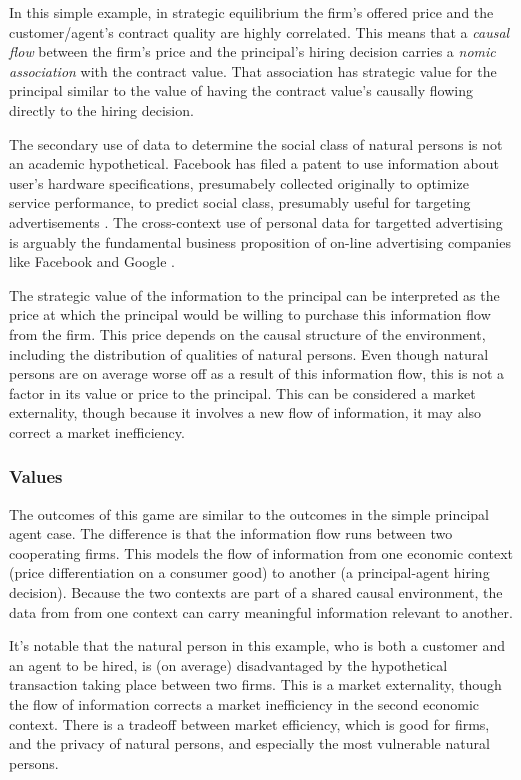 \documentclass[../thesis.tex]{subfiles}
\begin{document}
In this simple example, in strategic equilibrium the firm's offered
price and the customer/agent's contract quality
are highly correlated.
This means that a \emph{causal flow} between the firm's price and
the principal's hiring decision carries a \emph{nomic association}
with the contract value.
That association has strategic value for the principal similar to
the value of having the contract value's causally flowing directly
to the hiring decision.

The secondary use of data to determine the social class of
natural persons is not an academic hypothetical.
Facebook has filed a patent to use information about
user's hardware specifications, presumabely collected originally
to optimize service performance, to predict social class, presumably useful
for targeting advertisements \cite{cb_insights_research_2018}.
The cross-context use of personal data for targetted advertising
is arguably the fundamental business proposition of on-line
advertising companies like Facebook and Google \cite{narayanan_2018}.

The strategic value of the information to the principal can
be interpreted as the price at which the principal would
be willing to purchase this information flow from the firm.
This price depends on the causal structure of the environment,
including the distribution of qualities of natural persons.
Even though natural persons are on average worse off as a result
of this information flow, this is not a factor in its
value or price to the principal.
This can be considered a market externality, though
because it involves a new flow of information, it
may also correct a market inefficiency.

\subsubsection{Values}

The outcomes of this game are similar to the outcomes
in the simple principal agent case.
The difference is that the information flow
runs between two cooperating firms.
This models the flow of information from one
economic context (price differentiation on a consumer good)
to another (a principal-agent hiring decision).
Because the two contexts are part of a shared
causal environment, the data from from one context
can carry meaningful information relevant to another.

It's notable that the natural person in this example,
who is both a customer and an agent to be hired,
is (on average) disadvantaged by the hypothetical
transaction taking place between two firms.
This is a market externality, though the
flow of information corrects a market inefficiency
in the second economic context.
There is a tradeoff between market efficiency,
which is good for firms,
and the privacy of natural persons, and especially
the most vulnerable natural persons.
\end{document}
